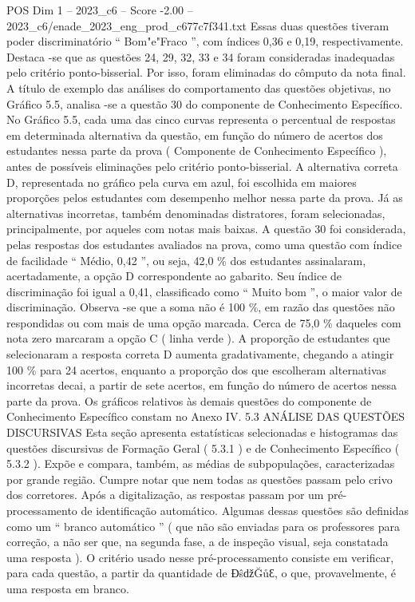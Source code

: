 \begin{textsample}{POS Dim 1 – 2023\_c6 – Score -2.00 – 2023\_c6/enade\_2023\_eng\_prod\_c677c7f341.txt}
Essas duas questões tiveram poder discriminatório “ Bom"e"Fraco ”, com índices 0,36 e 0,19, respectivamente.
Destaca -se que as questões 24, 29, 32, 33 e 34 foram consideradas inadequadas pelo critério ponto-bisserial.
Por isso, foram eliminadas do cômputo da nota final.
A título de exemplo das análises do comportamento das questões objetivas, no Gráfico 5.5, analisa -se a questão 30 do componente de Conhecimento Específico.
No Gráfico 5.5, cada uma das cinco curvas representa o percentual de respostas em determinada alternativa da questão, em função do número de acertos dos estudantes nessa parte da prova ( Componente de Conhecimento Específico ), antes de possíveis eliminações pelo critério ponto-bisserial.
A alternativa correta D, representada no gráfico pela curva em azul, foi escolhida em maiores proporções pelos estudantes com desempenho melhor nessa parte da prova.
Já as alternativas incorretas, também denominadas distratores, foram selecionadas, principalmente, por aqueles com notas mais baixas.
A questão 30 foi considerada, pelas respostas dos estudantes avaliados na prova, como uma questão com índice de facilidade “ Médio, 0,42 ”, ou seja, 42,0 \% dos estudantes assinalaram, acertadamente, a opção D correspondente ao gabarito.
Seu índice de discriminação foi igual a 0,41, classificado como “ Muito bom ”, o maior valor de discriminação.
Observa -se que a soma não é 100 \%, em razão das questões não respondidas ou com mais de uma opção marcada.
Cerca de 75,0 \% daqueles com nota zero marcaram a opção C ( linha verde ).
A proporção de estudantes que selecionaram a resposta correta D aumenta gradativamente, chegando a atingir 100 \% para 24 acertos, enquanto a proporção dos que escolheram alternativas incorretas decai, a partir de sete acertos, em função do número de acertos nessa parte da prova.
Os gráficos relativos às demais questões do componente de Conhecimento Específico constam no Anexo IV. 5.3 ANÁLISE DAS QUESTÕES DISCURSIVAS Esta seção apresenta estatísticas selecionadas e histogramas das questões discursivas de Formação Geral ( 5.3.1 ) e de Conhecimento Específico ( 5.3.2 ).
Expõe e compara, também, as médias de subpopulações, caracterizadas por grande região.
Cumpre notar que nem todas as questões passam pelo crivo dos corretores.
Após a digitalização, as respostas passam por um pré-processamento de identificação automático.
Algumas dessas questões são definidas como um “ branco automático ” ( que não são enviadas para os professores para correção, a não ser que, na segunda fase, a de inspeção visual, seja constatada uma resposta ).
O critério usado nesse pré-processamento consiste em verificar, para cada questão, a partir da quantidade de ƉŝǆĞůƐ, o que, provavelmente, é uma resposta em branco.

\end{textsample}
